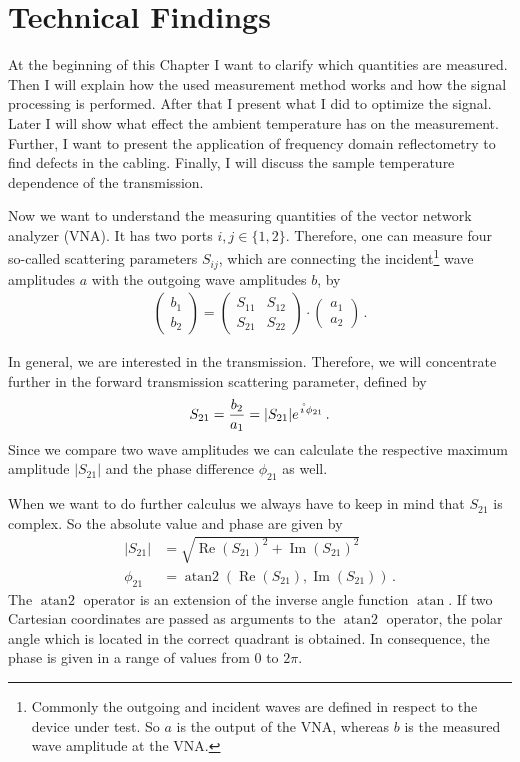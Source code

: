 \chapter{Technical Findings}
At the beginning of this Chapter I want to clarify which quantities are measured. Then I will explain how the used measurement method works and how the signal processing is performed. After that I present what I did to optimize the signal. Later I will show what effect the ambient temperature has on the measurement. Further, I want to present the application of frequency domain reflectometry to find defects in the cabling. Finally, I will discuss the sample temperature dependence of the transmission.

Now we want to understand the measuring quantities of the vector network analyzer (VNA). It has two ports $i,j \in \{1,2\}$. Therefore, one can measure four so-called scattering parameters $S_{ij}$, which are connecting the incident\footnote{Commonly the outgoing and incident waves are defined in respect to the device under test. So $a$ is the output of the VNA, whereas $b$ is the measured wave amplitude at the VNA.} wave amplitudes $a$ with the outgoing wave amplitudes $b$, by
\begin{align}
    \left(\begin{array}{c}
         b_1\\
         b_2
    \end{array}\right)
    =
    \left(\begin{array}{cc}
         S_{11}&S_{12}\\
         S_{21}&S_{22}
    \end{array}\right)
    \cdot
    \left(\begin{array}{c}
         a_1\\
         a_2
    \end{array}\right)\,.
\end{align}

In general, we are interested in the transmission. Therefore, we will concentrate further in the forward transmission scattering parameter, defined by
\begin{align}
    S_{21}=\frac{b_2}{a_1}=|S_{21}| e^{\ima\phi_{21}}\,.
\end{align}
Since we compare two wave amplitudes we can calculate the respective maximum amplitude $|S_{21}|$ and the phase difference $\phi_{21}$ as well.

When we want to do further calculus we always have to keep in mind that $S_{21}$ is complex. So the absolute value and phase are given by
\begin{align}
    |S_{21}|&=\sqrt{\operatorname{Re}(S_{21})^2+\operatorname{Im}(S_{21})^2}\\
    \phi_{21}&=\operatorname{atan2}\left(\operatorname{Re}(S_{21}),\operatorname{Im}(S_{21})\right)\,.
\end{align}
The $\operatorname{atan2}$ operator is an extension of the inverse angle function $\operatorname{atan}$. If two Cartesian coordinates are passed as arguments to the $\operatorname{atan2}$ operator, the polar angle which is located in the correct quadrant is obtained. In consequence, the phase is given in a range of values from $0$ to $2\pi$.

